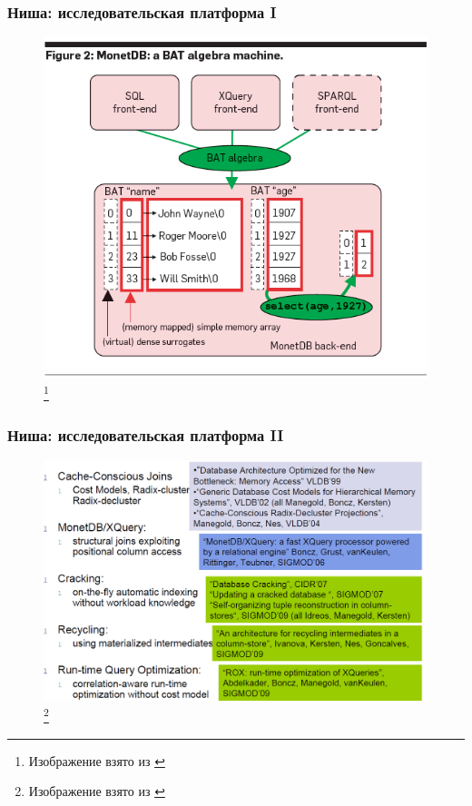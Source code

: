 \documentclass{beamer}
\begin{document}
\begin{frame}
\frametitle{Ниша: исследовательская платформа I}

\begin{figure}[htb]
\includegraphics[width=\textwidth,height=0.750\textheight,keepaspectratio]{frontends.png} 
\footnote{\tiny{Изображение взято из \cite{Harizopoulos2009}}}
\end{figure}

\end{frame}

\begin{frame}
\frametitle{Ниша: исследовательская платформа II}

\begin{figure}[htb]
\includegraphics[width=\textwidth,height=0.750\textheight,keepaspectratio]{research.png} 
\footnote{\tiny{Изображение взято из \cite{Boncz2008}}}
\end{figure}

\end{frame}
\end{document}
